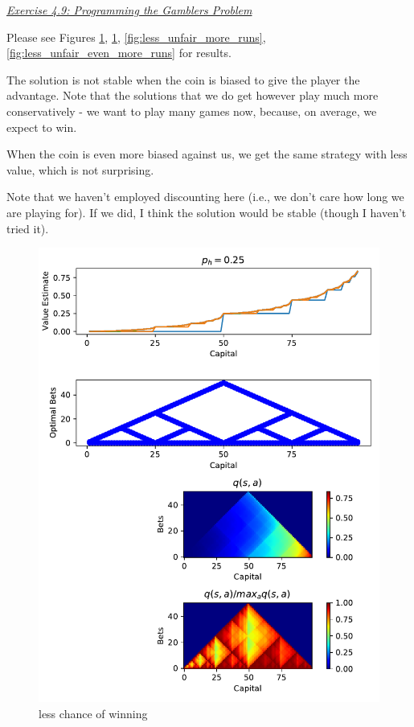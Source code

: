 \documentclass{article}
\newcommand{\myq}[1]{%
	\vspace{1em}
	\noindent\underline{\emph{Exercise #1}}\vspace{0.25em}\linebreak
}
\begin{document}
\myq{4.9: Programming the Gamblers Problem}
Please see Figures \ref{fig:more_unfair}, \ref{fig:more_unfair}, \ref{fig:less_unfair_more_runs}, \ref{fig:less_unfair_even_more_runs} for results.

The solution is not stable when the coin is biased to give the player the advantage. Note that the solutions that we do get however play much more conservatively - we want to play many games now, because, on average, we expect to win. 

When the coin is even more biased against us, we get the same strategy with less value, which is not surprising. 

Note that we haven't employed discounting here (i.e., we don't care how long we are playing for). If we did, I think the solution would be stable (though I haven't tried it). 

\begin{figure}
	\includegraphics[width=\textwidth]{more_unfair}
	\centering
	\caption{\label{fig:more_unfair} less chance of winning}
\end{figure} 
\end{document}
